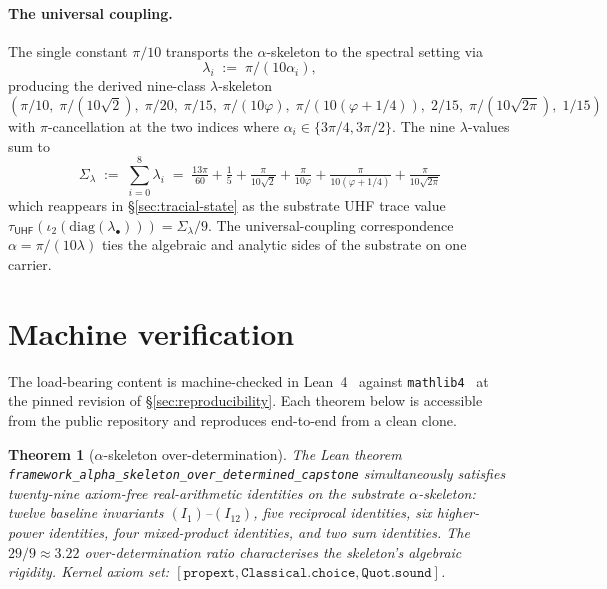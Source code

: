 \documentclass[11pt,a4paper]{amsart}
\theoremstyle{plain}
\newtheorem{theorem}{Theorem}[section]
\theoremstyle{definition}
\begin{document}
\paragraph{The universal coupling.} The single constant $\pi/10$ transports the $\alpha$-skeleton to the spectral setting via
\[
\lambda_i \;:=\; \pi / (10 \alpha_i),
\]
producing the derived nine-class $\lambda$-skeleton
\[
(\pi/10,\; \pi/(10\sqrt{2}),\; \pi/20,\; \pi/15,\; \pi/(10\varphi),\; \pi/(10(\varphi+1/4)),\; 2/15,\; \pi/(10\sqrt{2\pi}),\; 1/15)
\]
with $\pi$-cancellation at the two indices where $\alpha_i \in \{3\pi/4, 3\pi/2\}$. The nine $\lambda$-values sum to
\[
\Sigma_\lambda \;:=\; \sum_{i=0}^{8} \lambda_i \;=\; \tfrac{13\pi}{60} + \tfrac{1}{5} + \tfrac{\pi}{10\sqrt{2}} + \tfrac{\pi}{10\varphi} + \tfrac{\pi}{10(\varphi+1/4)} + \tfrac{\pi}{10\sqrt{2\pi}}
\]
which reappears in \S\ref{sec:tracial-state} as the substrate UHF trace value $\tau_{\textsf{UHF}}(\iota_2(\mathrm{diag}(\lambda_\bullet))) = \Sigma_\lambda / 9$. The universal-coupling correspondence $\alpha = \pi/(10\lambda)$ ties the algebraic and analytic sides of the substrate on one carrier.

\section{Machine verification}\label{sec:kernel-verified}

The load-bearing content is machine-checked in Lean~4~\cite{moura-ullrich2021} against \texttt{mathlib4}~\cite{mathlib2020} at the pinned revision of \S\ref{sec:reproducibility}. Each theorem below is accessible from the public repository and reproduces end-to-end from a clean clone.

\begin{theorem}[$\alpha$-skeleton over-determination]\label{thm:alpha-unique}
The Lean theorem \texttt{framework\_alpha\_skeleton\_over\_determined\_capstone} simultaneously satisfies twenty-nine axiom-free real-arithmetic identities on the substrate $\alpha$-skeleton: twelve baseline invariants $(I_1)$--$(I_{12})$, five reciprocal identities, six higher-power identities, four mixed-product identities, and two sum identities. The $29/9 \approx 3.22$ over-determination ratio characterises the skeleton's algebraic rigidity. Kernel axiom set: $[\texttt{propext}, \texttt{Classical.choice}, \texttt{Quot.sound}]$.
\end{theorem}
\end{document}
